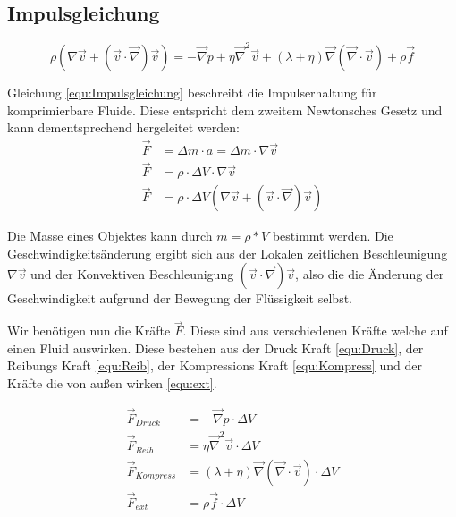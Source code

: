 \documentclass[a4paper, 12pt]{article}
\begin{document}
\subsection{Impulsgleichung}
\begin{equation} \label{equ:Impulsgleichung}
	\rho(\nabla \vec{v} + (\vec{v} \cdot \vec{\nabla})\vec{v}) = - \vec{\nabla}p + \eta \vec{\nabla}^2 \vec{v} + (\lambda + \eta)\vec{\nabla}(\vec{\nabla} \cdot \vec{v}) + \rho \vec{f}
\end{equation}

Gleichung \eqref{equ:Impulsgleichung} beschreibt die Impulserhaltung für komprimierbare Fluide. Diese entspricht dem zweitem Newtonsches Gesetz und kann dementsprechend hergeleitet werden:
\begin{align}
	\vec{F} & =\Delta m \cdot a = \Delta m \cdot \nabla \vec{v} \nonumber                 \\
	\vec{F} & =\rho \cdot \Delta V \cdot \nabla \vec{v} \nonumber                         \\
	\vec{F} & =\rho \cdot \Delta V (\nabla \vec{v} + (\vec{v} \cdot \vec{\nabla})\vec{v})
	\label{equ:Newtonsches_Gesetz}
\end{align}

Die Masse eines Objektes kann durch $m = \rho * V$ bestimmt werden. Die Geschwindigkeitsänderung ergibt sich aus der Lokalen zeitlichen Beschleunigung $\nabla \vec{v}$ und der Konvektiven Beschleunigung $(\vec{v} \cdot \vec{\nabla})\vec{v}$, also die die Änderung der Geschwindigkeit aufgrund der Bewegung der Flüssigkeit selbst.

Wir benötigen nun die Kräfte $\vec{F}$. Diese sind aus verschiedenen Kräfte welche auf einen Fluid auswirken. Diese bestehen aus der Druck Kraft \eqref{equ:Druck}, der Reibungs Kraft \eqref{equ:Reib}, der Kompressions Kraft \eqref{equ:Kompress} und der Kräfte die von außen wirken \eqref{equ:ext}.

\begin{align}
	\vec{F}_{Druck}    & = - \vec{\nabla}p \cdot \Delta V \label{equ:Druck}                                             \\
	\vec{F}_{Reib}     & = \eta \vec{\nabla}^2 \vec{v} \cdot \Delta V \label{equ:Reib}                                  \\
	\vec{F}_{Kompress} & = (\lambda + \eta)\vec{\nabla}(\vec{\nabla} \cdot \vec{v}) \cdot \Delta V \label{equ:Kompress} \\
	\vec{F}_{ext}      & = \rho \vec{f} \cdot \Delta V \label{equ:ext}
\end{align}
\end{document}
